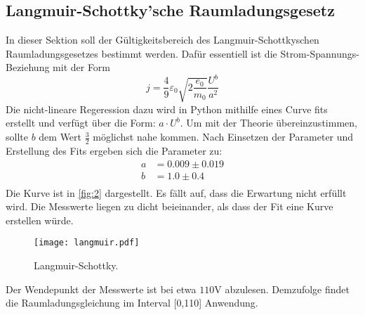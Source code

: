 \subsection{Langmuir-Schottky'sche Raumladungsgesetz}
In dieser Sektion soll der Gültigkeitsbereich des Langmuir-Schottkyschen 
Raumladungsgesetzes bestimmt werden. Dafür essentiell ist die Strom-Spannungs-
Beziehung mit der Form
\begin{equation}
    j = \frac{4}{9} \varepsilon_0 \sqrt{2 \frac{e_0}{m_0}} \frac{U^b}{a^2}
\end{equation}
Die nicht-lineare Regeression dazu wird in Python mithilfe eines Curve fits 
erstellt und verfügt über die Form: $a \cdot U^b$. Um mit der Theorie
übereinzustimmen, sollte $b$ dem Wert $\frac{3}{2}$ möglichst nahe kommen.
Nach Einsetzen der Parameter und Erstellung des Fits ergeben sich die Parameter 
zu:
\begin{align*}
    a &= 0.009 \pm 0.019 \\
    b &= 1.0 \pm 0.4 \\
\end{align*}
Die Kurve ist in \autoref{fig:2} dargestellt. Es fällt auf, dass die Erwartung 
nicht erfüllt wird. Die Messwerte liegen zu dicht beieinander, als dass der Fit 
eine Kurve erstellen würde.
\begin{figure}[H]
    \centering
    \texttt{[image: langmuir.pdf]}
    \caption{Langmuir-Schottky.}
    \label{fig:2}  %
\end{figure}
\noindent Der Wendepunkt der Messwerte ist bei etwa $110 \unit{\volt}$ abzulesen.
Demzufolge findet die Raumladungsgleichung im Interval [0,110] Anwendung.

